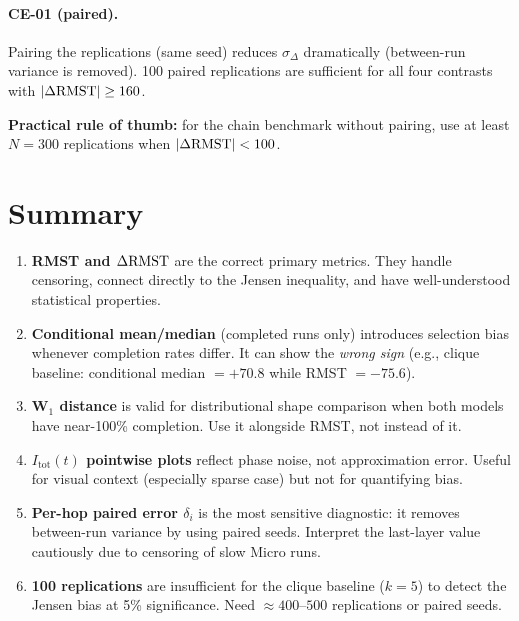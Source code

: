 \documentclass[11pt,a4paper]{article}
\begin{document}
\paragraph{CE-01 (paired).}
Pairing the replications (same seed) reduces $\sigma_\Delta$ dramatically
(between-run variance is removed).  100 paired replications are sufficient
for all four contrasts with $|\Delta\mathrm{RMST}| \geq 160$.

\textbf{Practical rule of thumb:} for the chain benchmark without pairing,
use at least $N = 300$ replications when $|\Delta\mathrm{RMST}| < 100$.

\section{Summary}

\begin{enumerate}
  \item \textbf{RMST and $\Delta\mathrm{RMST}$} are the correct primary metrics.
        They handle censoring, connect directly to the Jensen inequality,
        and have well-understood statistical properties.

  \item \textbf{Conditional mean/median} (completed runs only) introduces
        selection bias whenever completion rates differ.  It can show the
        \emph{wrong sign} (e.g., clique baseline: conditional median $= +70.8$
        while RMST $= -75.6$).

  \item \textbf{W$_1$ distance} is valid for distributional shape comparison
        when both models have near-100\% completion.  Use it alongside RMST,
        not instead of it.

  \item \textbf{$I_{\mathrm{tot}}(t)$ pointwise plots} reflect phase noise,
        not approximation error.  Useful for visual context (especially
        sparse case) but not for quantifying bias.

  \item \textbf{Per-hop paired error $\delta_i$} is the most sensitive
        diagnostic: it removes between-run variance by using paired seeds.
        Interpret the last-layer value cautiously due to censoring of
        slow Micro runs.

  \item \textbf{100 replications} are insufficient for the clique baseline
        ($k=5$) to detect the Jensen bias at 5\% significance.
        Need $\approx 400$--$500$ replications or paired seeds.
\end{enumerate}
\end{document}
